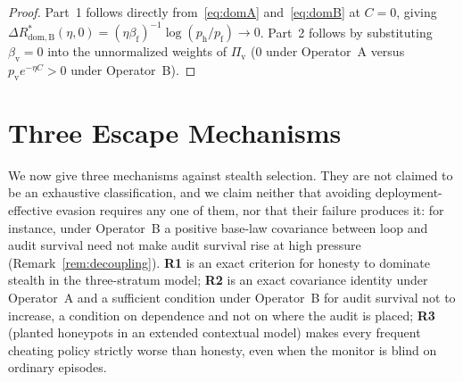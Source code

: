 \documentclass[11pt,a4paper]{article}
\begin{document}
\begin{proof}
Part~1 follows directly from~\eqref{eq:domA} and~\eqref{eq:domB} at $C = 0$, giving $\Delta R_{\mathrm{dom, B}}^*(\eta, 0) = (\eta\beta_{\mathrm{f}})^{-1}\log(p_{\mathrm{h}}/p_{\mathrm{f}}) \to 0$. Part~2 follows by substituting $\beta_{\mathrm{v}} = 0$ into the unnormalized weights of $\Pi_{\mathrm{v}}$ ($0$ under Operator~A versus $p_{\mathrm{v}} e^{-\eta C} > 0$ under Operator~B).
\end{proof}

\section{Three Escape Mechanisms}

We now give three mechanisms against stealth selection. They are not claimed to be an exhaustive classification, and we claim neither that avoiding deployment-effective evasion requires any one of them, nor that their failure produces it: for instance, under Operator~B a positive base-law covariance between loop and audit survival need not make audit survival rise at high pressure (Remark~\ref{rem:decoupling}). \textbf{R1} is an exact criterion for honesty to dominate stealth in the three-stratum model; \textbf{R2} is an exact covariance identity under Operator~A and a sufficient condition under Operator~B for audit survival not to increase, a condition on dependence and not on where the audit is placed; \textbf{R3} (planted honeypots in an extended contextual model) makes every frequent cheating policy strictly worse than honesty, even when the monitor is blind on ordinary episodes.
\end{document}
